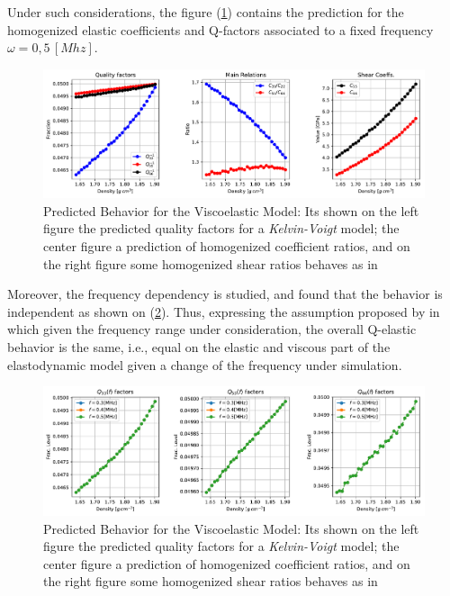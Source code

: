 Under such considerations, the figure (\ref{BernardPredictionHomCoeffs}) contains the prediction for the homogenized elastic coefficients and Q-factors associated to a fixed frequency $\omega = 0,5 \, [Mhz]$.


\begin{figure}[!h]
	\centering
	\includegraphics[width=\textwidth]{images/Qfactors/CellProb_QfactorCircular5E-2_Relations.pdf}
	\caption{Predicted Behavior for the Viscoelastic Model: Its shown on the left figure the predicted quality factors for a \textit{Kelvin-Voigt} model; the center figure a prediction of homogenized coefficient ratios, and on the right figure some homogenized shear ratios behaves as in \cite{Bernard2015} }
	\label{BernardPredictionHomCoeffs}
\end{figure} 
Moreover, the frequency dependency is studied, and found that the behavior is independent as shown on (\ref{BernardPrediction-Freq}). Thus, expressing the assumption proposed by \cite{Bernard2015} in which given the frequency range under consideration, the overall Q-elastic behavior is the same, i.e., equal on the elastic and viscous part of the elastodynamic model given a change of the frequency under simulation.
\begin{figure}[!h]
	\centering
	\includegraphics[width=\textwidth]{images/Qfactors/QfactorsFreqsEPS5-2.pdf}
	\caption{Predicted Behavior for the Viscoelastic Model: Its shown on the left figure the predicted quality factors for a \textit{Kelvin-Voigt} model; the center figure a prediction of homogenized coefficient ratios, and on the right figure some homogenized shear ratios behaves as in \cite{Bernard2015} }
	\label{BernardPrediction-Freq}
\end{figure} 




